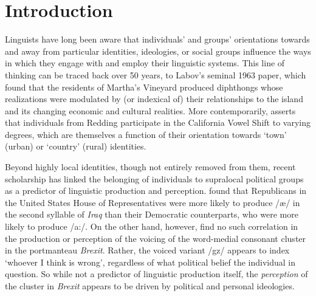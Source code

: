 \documentclass[10pt,letterpaper]{article}
\begin{document}
	\section{Introduction}
	Linguists have long been aware that individuals' and groups' orientations towards and away from particular identities, ideologies, or social groups influence the ways in which they engage with and employ their linguistic systems. This line of thinking can be traced back over 50 years, to Labov's seminal 1963 paper, which found that the residents of Martha's Vineyard produced diphthongs whose realizations were modulated by (or indexical of) their relationships to the island and its changing economic and cultural realities. More contemporarily, \textcite{podesva2015country} asserts that individuals from Redding participate in the California Vowel Shift to varying degrees, which are themselves a function of their orientation towards `town' (urban) or `country' (rural) identities. \par 
	Beyond highly local identities, though not entirely removed from them, recent scholarship has linked the belonging of individuals to supralocal political groups as a predictor of linguistic production and perception. \textcite{hall2010indexing} found that Republicans in the United States House of Representatives were more likely to produce /\ae/ in the second syllable of \textit{Iraq} than their Democratic counterparts, who were more likely to produce /a:/. On the other hand, however, \textcite{hall2020breksit} find no such correlation in the production or perception of the voicing of the word-medial consonant cluster in the portmanteau \textit{Brexit}. Rather, the voiced variant /gz/ appears to index `whoever I think is wrong', regardless of what political belief the individual in question. So while not a predictor of linguistic production itself, the \textit{perception} of the cluster in \textit{Brexit} appears to be driven by political and personal ideologies.\par 
\end{document}
